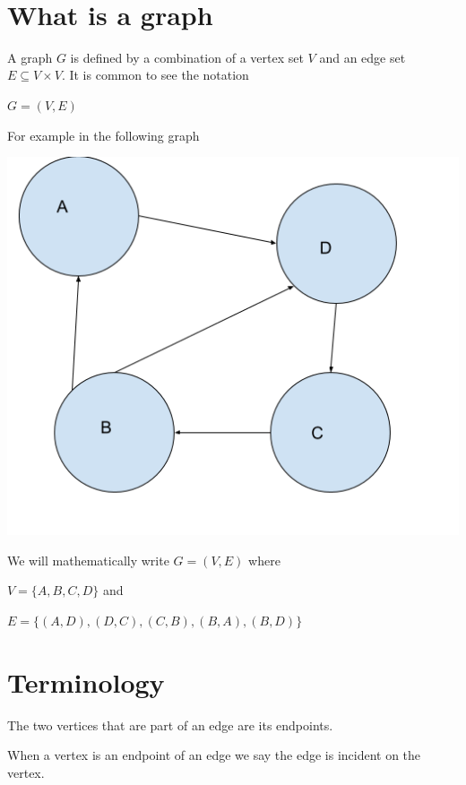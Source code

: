 \documentclass[12pt]{article}
\begin{document}
\begin{center}
\\
\vspace{1cm}
\end{center}

\vspace{0.5cm}\noindent


\section*{What is a graph}

A graph $G$ is defined by a combination of a vertex set $V$ and an edge set $E \subseteq V \times V$.
It is common to see the notation

$G = (V,E)$

For example in the following graph

\includegraphics[scale=0.5]{./img/graph1.png}

We will mathematically write $G = (V, E)$ where 

$V = \{A,B,C,D\}$ and 

$E = \{(A,D), (D,C), (C,B), (B,A), (B,D)\}$

\section*{Terminology}

The two vertices that are part of an edge are its endpoints.

When a vertex is an endpoint of an edge we say the edge is incident on the vertex.
\end{document}
